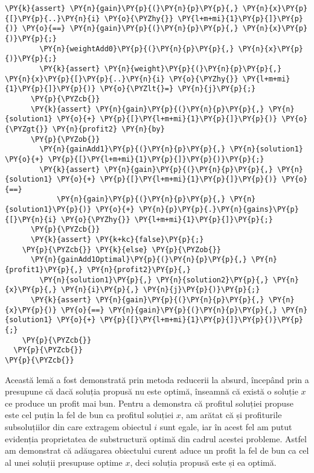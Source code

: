 \begin{sloppypar}
\begin{Verbatim}[commandchars=\\\{\}]
        \PY{k}{assert} \PY{n}{gain}\PY{p}{(}\PY{n}{p}\PY{p}{,} \PY{n}{x}\PY{p}{[}\PY{p}{..}\PY{n}{i} \PY{o}{\PYZhy{}} \PY{l+m+mi}{1}\PY{p}{]}\PY{p}{)} \PY{o}{==} \PY{n}{gain}\PY{p}{(}\PY{n}{p}\PY{p}{,} \PY{n}{x}\PY{p}{)}\PY{p}{;}
        \PY{n}{weightAdd0}\PY{p}{(}\PY{n}{p}\PY{p}{,} \PY{n}{x}\PY{p}{)}\PY{p}{;}
        \PY{k}{assert} \PY{n}{weight}\PY{p}{(}\PY{n}{p}\PY{p}{,} \PY{n}{x}\PY{p}{[}\PY{p}{..}\PY{n}{i} \PY{o}{\PYZhy{}} \PY{l+m+mi}{1}\PY{p}{]}\PY{p}{)} \PY{o}{\PYZlt{}=} \PY{n}{j}\PY{p}{;}
      \PY{p}{\PYZcb{}}
      \PY{k}{assert} \PY{n}{gain}\PY{p}{(}\PY{n}{p}\PY{p}{,} \PY{n}{solution1} \PY{o}{+} \PY{p}{[}\PY{l+m+mi}{1}\PY{p}{]}\PY{p}{)} \PY{o}{\PYZgt{}} \PY{n}{profit2} \PY{n}{by} 
      \PY{p}{\PYZob{}}
        \PY{n}{gainAdd1}\PY{p}{(}\PY{n}{p}\PY{p}{,} \PY{n}{solution1} \PY{o}{+} \PY{p}{[}\PY{l+m+mi}{1}\PY{p}{]}\PY{p}{)}\PY{p}{;}
        \PY{k}{assert} \PY{n}{gain}\PY{p}{(}\PY{n}{p}\PY{p}{,} \PY{n}{solution1} \PY{o}{+} \PY{p}{[}\PY{l+m+mi}{1}\PY{p}{]}\PY{p}{)} \PY{o}{==} 
            \PY{n}{gain}\PY{p}{(}\PY{n}{p}\PY{p}{,} \PY{n}{solution1}\PY{p}{)} \PY{o}{+} \PY{n}{p}\PY{p}{.}\PY{n}{gains}\PY{p}{[}\PY{n}{i} \PY{o}{\PYZhy{}} \PY{l+m+mi}{1}\PY{p}{]}\PY{p}{;}
      \PY{p}{\PYZcb{}}
      \PY{k}{assert} \PY{k+kc}{false}\PY{p}{;} 
    \PY{p}{\PYZcb{}} \PY{k}{else} \PY{p}{\PYZob{}}
      \PY{n}{gainAdd1Optimal}\PY{p}{(}\PY{n}{p}\PY{p}{,} \PY{n}{profit1}\PY{p}{,} \PY{n}{profit2}\PY{p}{,} 
        \PY{n}{solution1}\PY{p}{,} \PY{n}{solution2}\PY{p}{,} \PY{n}{x}\PY{p}{,} \PY{n}{i}\PY{p}{,} \PY{n}{j}\PY{p}{)}\PY{p}{;}
      \PY{k}{assert} \PY{n}{gain}\PY{p}{(}\PY{n}{p}\PY{p}{,} \PY{n}{x}\PY{p}{)} \PY{o}{==} \PY{n}{gain}\PY{p}{(}\PY{n}{p}\PY{p}{,} \PY{n}{solution1} \PY{o}{+} \PY{p}{[}\PY{l+m+mi}{1}\PY{p}{]}\PY{p}{)}\PY{p}{;}
    \PY{p}{\PYZcb{}}
  \PY{p}{\PYZcb{}}
\PY{p}{\PYZcb{}}
\end{Verbatim}
\hspace{4mm} Această lemă a fost demonstrată prin metoda reducerii la absurd, începând prin a presupune că dacă soluția propusă nu este optimă, înseamnă că există o soluție $x$ ce produce un profit mai bun. Pentru a demonstra că profitul soluției propuse este cel puțin la fel de bun ca profitul soluției $x$, am arătat că și profiturile subsoluțiilor din care extragem obiectul $i$ sunt egale, iar în acest fel am putut evidenția proprietatea de substructură optimă din cadrul acestei probleme. Astfel am demonstrat că adăugarea obiectului curent aduce un profit la fel de bun ca cel al unei soluții presupuse optime $x$, deci soluția propusă este și ea optimă. \par

\end{sloppypar}
